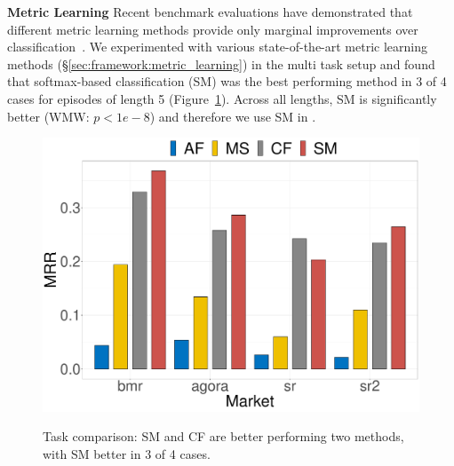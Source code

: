 \noindent \textbf{Metric Learning}
Recent benchmark evaluations have demonstrated that different metric learning methods provide only marginal improvements over classification~\cite{musgrave2020metric,Zhai2019ClassificationIA}. 
We experimented with various state-of-the-art metric learning methods (\S\ref{sec:framework:metric_learning}) in the multi task setup and found that softmax-based classification (SM) was the best performing method in 3 of 4 cases for episodes of length 5 (Figure~\ref{fig:metric_learning}). 
Across all lengths, SM is significantly better (WMW: $p < 1e-8$) and therefore we use SM in \SYSMLmethodname{}.

\begin{figure}[!htbp]
    \centering
    \includegraphics[width=0.8\linewidth,alt={Bar chart showing comparison of metric learning approaches.}]{sysml/plots/nce_comparison_multitask.pdf}
    \caption{Task comparison: SM and CF are better performing two methods, with SM better in 3 of 4 cases.}
    \label{fig:metric_learning}
\end{figure}


